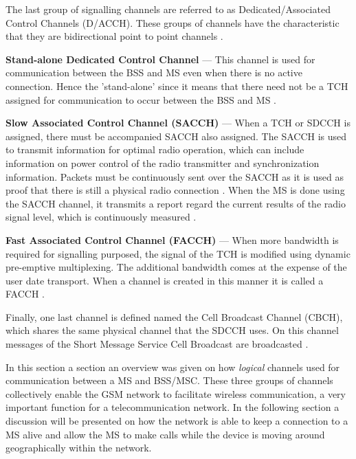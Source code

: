 The last group of signalling channels are referred to as Dedicated/Associated Control Channels (D/ACCH). These groups of channels have the characteristic that they are bidirectional point to point channels \cite{GSMArchitectureProtocolsServices}.
\begin{description}
\item{\textbf{Stand-alone Dedicated Control Channel}} --- This channel is used for communication between the BSS and MS even when there is no active connection. Hence the 'stand-alone' since it means that there need not be a TCH assigned for communication to occur between the BSS and MS \cite{GSMArchitectureProtocolsServices}.
\item{\textbf{Slow Associated Control Channel (SACCH)}} --- When a TCH or SDCCH is assigned, there must be accompanied SACCH also assigned. The SACCH is used to transmit information for optimal radio operation, which can include information on power control of the radio transmitter and synchronization information. Packets must be continuously sent over the SACCH as it is used as proof that there is still a physical radio connection \cite{GSMArchitectureProtocolsServices}. When the MS is done using the SACCH channel, it transmits a report regard the current results of the radio signal level, which is continuously measured \cite{GSMArchitectureProtocolsServices}.
\item{\textbf{Fast Associated Control Channel (FACCH)}} --- When more bandwidth is required for signalling purposed, the signal of the TCH is modified using dynamic pre-emptive multiplexing. The additional bandwidth comes at the expense of the user date transport. When a channel is created in this manner it is called a FACCH \cite{GSMArchitectureProtocolsServices}.
\end{description}

Finally, one last channel is defined named the Cell Broadcast Channel (CBCH), which shares the same physical channel that the SDCCH uses. On this channel messages of the Short Message Service Cell Broadcast are broadcasted \cite{GSMArchitectureProtocolsServices}.

In this section a section an overview was given on how \emph{logical} channels used for communication between a MS and BSS/MSC. These three groups of channels collectively enable the GSM network to facilitate wireless communication, a very important function for a telecommunication network. In the following section a discussion will be presented on how the network is able to keep a connection to a MS alive and allow the MS to make calls while the device is moving around geographically within the network.
